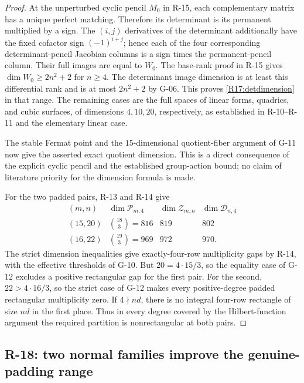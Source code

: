 \documentclass[11pt,a4paper]{article}
\theoremstyle{definition}\newtheorem{definition}{Definition}
\begin{document}
\begin{proof}
At the unperturbed cyclic pencil $M_0$ in R-15, each
complementary matrix has a unique perfect matching.
Therefore its determinant is its permanent multiplied by a
sign. The $(i,j)$ derivatives of the determinant additionally
have the fixed cofactor sign $(-1)^{i+j}$; hence each of the
four corresponding determinant-pencil Jacobian columns is
a sign times the permanent-pencil column. Their full images
are equal to $W_0$. The base-rank proof in R-15 gives
$\dim W_0\geq2n^2+2$ for $n\geq4$.
The determinant image dimension is at least this differential
rank and is at most $2n^2+2$ by G-06. This proves
\eqref{R17:detdimension} in that range. The remaining cases
are the full spaces of linear forms, quadrics, and cubic
surfaces, of dimensions $4,10,20$, respectively, as established
in R-10--R-11 and the elementary linear case.

The stable Fermat point and the $15$-dimensional quotient-fiber
argument of G-11 now give the asserted exact quotient dimension.
This is a direct consequence of the explicit cyclic pencil and
the established group-action bound; no claim of literature
priority for the dimension formula is made.

For the two padded pairs, R-13 and R-14 give
\[
 \begin{array}{c|c|c|c}
 (m,n)&\dim\mathcal P_{m,4}&\dim\mathcal Z_{m,n}
                    &\dim\mathcal D_{n,4}\\ \hline
 (15,20)&\binom{18}{3}=816&819&802\\
 (16,22)&\binom{19}{3}=969&972&970.
 \end{array}
\]
The strict dimension inequalities give exactly-four-row
multiplicity gaps by R-14, with the effective thresholds of
G-10. But $20=4\cdot15/3$, so the equality case of G-12
excludes a positive rectangular gap for the first pair.
For the second, $22>4\cdot16/3$, so the strict case of G-12
makes every positive-degree padded rectangular multiplicity
zero. If $4\nmid nd$, there is no integral four-row rectangle
of size $nd$ in the first place. Thus in every degree covered
by the Hilbert-function argument the required partition is
nonrectangular at both pairs.
\end{proof}


\subsection{R-18: two normal families improve the genuine-padding range}
\end{document}
